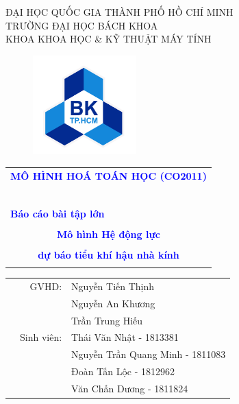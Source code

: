\documentclass[a4paper]{article}
\begin{document}
\begin{titlepage}
\begin{center}
\large{ĐẠI HỌC QUỐC GIA THÀNH PHỐ HỒ CHÍ MINH} \\
\large{TRƯỜNG ĐẠI HỌC BÁCH KHOA} \\
\normalsize{KHOA KHOA HỌC \& KỸ THUẬT MÁY TÍNH}
\end{center}


\begin{figure}[h!]
\begin{center}
\includegraphics[width=4cm]{hcmut.png}
\end{center}
\end{figure}


\textcolor{blue}{
\begin{center}
\begin{tabular}{c}
\multicolumn{1}{l}{\textbf{{\Large MÔ HÌNH HOÁ TOÁN HỌC (CO2011)}}}\\
~~\\
\hline
\\
\multicolumn{1}{l}{\textbf{{\Large Báo cáo bài tập lớn}}}\\
\\
\textbf{{\Huge Mô hình Hệ động lực}}\\
\\
\textbf{{\Huge dự báo tiểu khí hậu nhà kính}}\\
\\
\hline
\end{tabular}
\end{center}
}


\vspace{1cm}

\begin{table}[h]
\begin{tabular}{>{}r >{}r >{}l}
\hspace{5 cm} & GVHD: & Nguyễn Tiến Thịnh \\
              &          & Nguyễn An Khương \\
              &          & Trần Trung Hiếu \\
& Sinh viên: & Thái Văn Nhật - 1813381 \\
& & Nguyễn Trần Quang Minh - 1811083\\
& & Đoàn Tấn Lộc - 1812962\\
& & Văn Chấn Dương - 1811824 \\



\end{tabular}
\end{table}
\end{titlepage}
\end{document}
